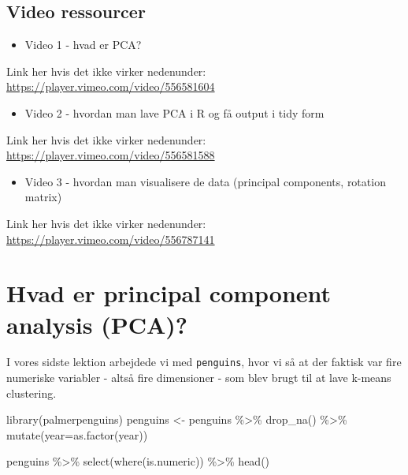 \documentclass[
]{book}
\newenvironment{Shaded}{\begin{snugshade}}{\end{snugshade}}
\newcommand{\AttributeTok}[1]{\textcolor[rgb]{0.77,0.63,0.00}{#1}}
\newcommand{\FunctionTok}[1]{\textcolor[rgb]{0.00,0.00,0.00}{#1}}
\newcommand{\NormalTok}[1]{#1}
\newcommand{\OtherTok}[1]{\textcolor[rgb]{0.56,0.35,0.01}{#1}}
\newcommand{\SpecialCharTok}[1]{\textcolor[rgb]{0.00,0.00,0.00}{#1}}
\providecommand{\tightlist}{%
  \setlength{\itemsep}{0pt}\setlength{\parskip}{0pt}}
\begin{document}
\hypertarget{video-ressourcer-6}{%
\subsection{Video ressourcer}\label{video-ressourcer-6}}

\begin{itemize}
\tightlist
\item
  Video 1 - hvad er PCA?
\end{itemize}

Link her hvis det ikke virker nedenunder: \url{https://player.vimeo.com/video/556581604}

\begin{itemize}
\tightlist
\item
  Video 2 - hvordan man lave PCA i R og få output i tidy form
\end{itemize}

Link her hvis det ikke virker nedenunder: \url{https://player.vimeo.com/video/556581588}

\begin{itemize}
\tightlist
\item
  Video 3 - hvordan man visualisere de data (principal components, rotation matrix)
\end{itemize}

Link her hvis det ikke virker nedenunder: \url{https://player.vimeo.com/video/556787141}

\hypertarget{hvad-er-principal-component-analysis-pca}{%
\section{Hvad er principal component analysis (PCA)?}\label{hvad-er-principal-component-analysis-pca}}

I vores sidste lektion arbejdede vi med \texttt{penguins}, hvor vi så at der faktisk var fire numeriske variabler - altså fire dimensioner - som blev brugt til at lave k-means clustering.

\begin{Shaded}
\begin{Highlighting}[]
\FunctionTok{library}\NormalTok{(palmerpenguins)}
\NormalTok{penguins }\OtherTok{\textless{}{-}}\NormalTok{ penguins }\SpecialCharTok{\%\textgreater{}\%} 
  \FunctionTok{drop\_na}\NormalTok{() }\SpecialCharTok{\%\textgreater{}\%}
  \FunctionTok{mutate}\NormalTok{(}\AttributeTok{year=}\FunctionTok{as.factor}\NormalTok{(year))}

\NormalTok{penguins }\SpecialCharTok{\%\textgreater{}\%} \FunctionTok{select}\NormalTok{(}\FunctionTok{where}\NormalTok{(is.numeric)) }\SpecialCharTok{\%\textgreater{}\%} \FunctionTok{head}\NormalTok{()}
\end{Highlighting}
\end{Shaded}
\end{document}

